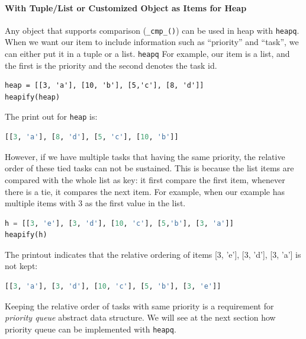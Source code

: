 \documentclass[../main.tex]{subfiles}
\begin{document}
\paragraph{With Tuple/List or Customized Object as Items for Heap}
Any object that supports comparison (\texttt{\_cmp\_()}) can be used in heap with \texttt{heapq}. When we want our item to include information such as ``priority'' and ``task'', we can either put it in a tuple or a list. \texttt{heapq} For example, our item is a list, and the first is the priority and the second denotes the task id.
\begin{lstlisting}
heap = [[3, 'a'], [10, 'b'], [5,'c'], [8, 'd']]
heapify(heap)
\end{lstlisting}
The print out for \texttt{heap} is:
\begin{lstlisting}[language=Python]
[[3, 'a'], [8, 'd'], [5, 'c'], [10, 'b']]
\end{lstlisting}
However, if we have multiple tasks that having the same priority, the relative order of these tied tasks can not be sustained. This is because the list items are compared with the whole list as key: it first compare the first item, whenever there is a tie, it compares the next item. For example, when our example has multiple items with $3$ as the first value in the list. 
\begin{lstlisting}[language=Python]
h = [[3, 'e'], [3, 'd'], [10, 'c'], [5,'b'], [3, 'a']]
heapify(h)
\end{lstlisting}
The printout indicates that the relative ordering of items [3, 'e'], [3, 'd'], [3, 'a'] is not kept:
\begin{lstlisting}[language=Python]
[[3, 'a'], [3, 'd'], [10, 'c'], [5, 'b'], [3, 'e']]
\end{lstlisting}
Keeping the relative order of tasks with same priority is a requirement for \textit{priority queue} abstract data structure. We will see at the next section how priority queue can be implemented with \texttt{heapq}. 
\end{document}
